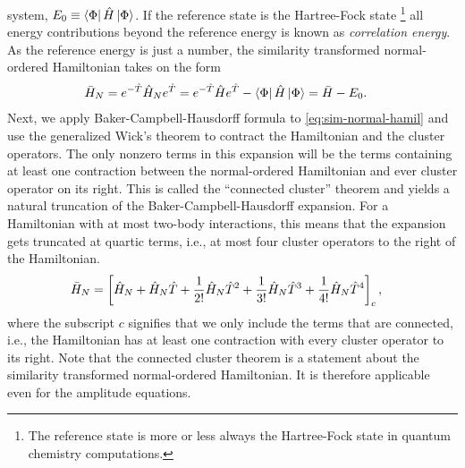             system, $E_{0} \equiv \bra{\Phi}\hat{H}\ket{\Phi}$.
            If the reference state is the Hartree-Fock state%
            \footnote{
                The reference state is more or less always the Hartree-Fock
                state in quantum chemistry computations.
            }
            all energy contributions beyond the reference energy is known as
            \emph{correlation energy}.
            As the reference energy is just a number, the similarity transformed
            normal-ordered Hamiltonian takes on the form
            \begin{align}
                \bar{H}_N
                &= e^{-\hat{T}}\hat{H}_N e^{\hat{T}}
                = e^{-\hat{T}}\hat{H} e^{\hat{T}} - \bra{\Phi}\hat{H}\ket{\Phi}
                = \bar{H} - E_{0}.
                \label{eq:sim-normal-hamil}
            \end{align}
            Next, we apply Baker-Campbell-Hausdorff formula to
            \autoref{eq:sim-normal-hamil} and use the generalized Wick's theorem
            to contract the Hamiltonian and the cluster operators.
            The only nonzero terms in this expansion will be the terms
            containing at least one contraction between the normal-ordered
            Hamiltonian and ever cluster operator on its right.
            This is called the ``connected cluster'' theorem and yields a
            natural truncation of the Baker-Campbell-Hausdorff expansion.
            For a Hamiltonian with at most two-body interactions, this means
            that the expansion gets truncated at quartic terms, i.e., at most
            four cluster operators to the right of the Hamiltonian.
            \begin{align}
                \bar{H}_N
                &=
                \left[ 
                    \hat{H}_N
                    + \hat{H}_N \hat{T}
                    + \frac{1}{2!} \hat{H}_N \hat{T}^2
                    + \frac{1}{3!} \hat{H}_N \hat{T}^3
                    + \frac{1}{4!} \hat{H}_N \hat{T}^4
                 \right]_c,
                \label{eq:connected-hamil}
            \end{align}
            where the subscript $c$ signifies that we only include the terms
            that are connected, i.e., the Hamiltonian has at least one
            contraction with every cluster operator to its right.
            Note that the connected cluster theorem is a statement about the
            similarity transformed normal-ordered Hamiltonian.
            It is therefore applicable even for the amplitude equations.

